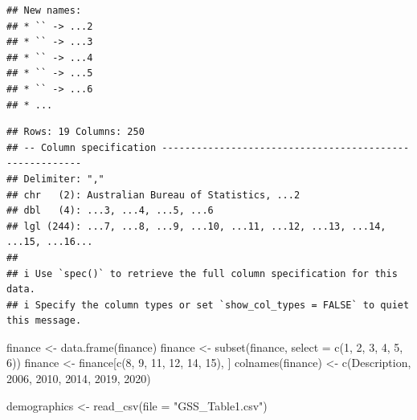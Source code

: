 \documentclass[
]{article}
\newenvironment{Shaded}{\begin{snugshade}}{\end{snugshade}}
\newcommand{\AttributeTok}[1]{\textcolor[rgb]{0.77,0.63,0.00}{#1}}
\newcommand{\DecValTok}[1]{\textcolor[rgb]{0.00,0.00,0.81}{#1}}
\newcommand{\FunctionTok}[1]{\textcolor[rgb]{0.00,0.00,0.00}{#1}}
\newcommand{\NormalTok}[1]{#1}
\newcommand{\OtherTok}[1]{\textcolor[rgb]{0.56,0.35,0.01}{#1}}
\newcommand{\StringTok}[1]{\textcolor[rgb]{0.31,0.60,0.02}{#1}}
\begin{document}
\begin{verbatim}
## New names:
## * `` -> ...2
## * `` -> ...3
## * `` -> ...4
## * `` -> ...5
## * `` -> ...6
## * ...
\end{verbatim}

\begin{verbatim}
## Rows: 19 Columns: 250
## -- Column specification --------------------------------------------------------
## Delimiter: ","
## chr   (2): Australian Bureau of Statistics, ...2
## dbl   (4): ...3, ...4, ...5, ...6
## lgl (244): ...7, ...8, ...9, ...10, ...11, ...12, ...13, ...14, ...15, ...16...
## 
## i Use `spec()` to retrieve the full column specification for this data.
## i Specify the column types or set `show_col_types = FALSE` to quiet this message.
\end{verbatim}

\begin{Shaded}
\begin{Highlighting}[]
\NormalTok{finance }\OtherTok{\textless{}{-}} \FunctionTok{data.frame}\NormalTok{(finance)}
\NormalTok{finance }\OtherTok{\textless{}{-}} \FunctionTok{subset}\NormalTok{(finance, }\AttributeTok{select =} \FunctionTok{c}\NormalTok{(}\DecValTok{1}\NormalTok{, }\DecValTok{2}\NormalTok{, }\DecValTok{3}\NormalTok{, }\DecValTok{4}\NormalTok{, }\DecValTok{5}\NormalTok{, }\DecValTok{6}\NormalTok{))}
\NormalTok{finance }\OtherTok{\textless{}{-}}\NormalTok{ finance[}\FunctionTok{c}\NormalTok{(}\DecValTok{8}\NormalTok{, }\DecValTok{9}\NormalTok{, }\DecValTok{11}\NormalTok{, }\DecValTok{12}\NormalTok{, }\DecValTok{14}\NormalTok{, }\DecValTok{15}\NormalTok{), ]}
\FunctionTok{colnames}\NormalTok{(finance) }\OtherTok{\textless{}{-}} \FunctionTok{c}\NormalTok{(}\StringTok{\textquotesingle{}Description\textquotesingle{}}\NormalTok{, }\StringTok{\textquotesingle{}2006\textquotesingle{}}\NormalTok{, }\StringTok{\textquotesingle{}2010\textquotesingle{}}\NormalTok{, }\StringTok{\textquotesingle{}2014\textquotesingle{}}\NormalTok{, }\StringTok{\textquotesingle{}2019\textquotesingle{}}\NormalTok{, }\StringTok{\textquotesingle{}2020\textquotesingle{}}\NormalTok{)}
\end{Highlighting}
\end{Shaded}

\begin{Shaded}
\begin{Highlighting}[]
\NormalTok{demographics }\OtherTok{\textless{}{-}} \FunctionTok{read\_csv}\NormalTok{(}\AttributeTok{file =} \StringTok{"GSS\_Table1.csv"}\NormalTok{)}
\end{Highlighting}
\end{Shaded}
\end{document}
